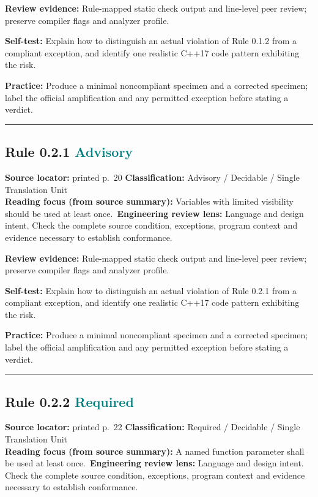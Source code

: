 \documentclass[10pt,letterpaper]{article}
\begin{document}
\textbf{Review evidence:} Rule-mapped static check output and line-level peer review; preserve compiler flags and analyzer profile.

\textbf{Self-test:} Explain how to distinguish an actual violation of Rule 0.1.2 from a compliant exception, and identify one realistic C++17 code pattern exhibiting the risk.\par
\textbf{Practice:} Produce a minimal noncompliant specimen and a corrected specimen; label the official amplification and any permitted exception before stating a verdict.
\smallskip\hrule\smallskip
\subsection*{Rule 0.2.1 \enspace \texorpdfstring{\small\textcolor{teal}{Advisory}}{Advisory}}
\noindent\textbf{Source locator:} printed p.~20 \quad\textbf{Classification:} Advisory / Decidable / Single Translation Unit\\
\textbf{Reading focus (from source summary):} Variables with limited visibility should be used at least once.\
\textbf{Engineering review lens:} Language and design intent. Check the complete source condition, exceptions, program context and evidence necessary to establish conformance.

\textbf{Review evidence:} Rule-mapped static check output and line-level peer review; preserve compiler flags and analyzer profile.

\textbf{Self-test:} Explain how to distinguish an actual violation of Rule 0.2.1 from a compliant exception, and identify one realistic C++17 code pattern exhibiting the risk.\par
\textbf{Practice:} Produce a minimal noncompliant specimen and a corrected specimen; label the official amplification and any permitted exception before stating a verdict.
\smallskip\hrule\smallskip
\subsection*{Rule 0.2.2 \enspace \texorpdfstring{\small\textcolor{teal}{Required}}{Required}}
\noindent\textbf{Source locator:} printed p.~22 \quad\textbf{Classification:} Required / Decidable / Single Translation Unit\\
\textbf{Reading focus (from source summary):} A named function parameter shall be used at least once.\
\textbf{Engineering review lens:} Language and design intent. Check the complete source condition, exceptions, program context and evidence necessary to establish conformance.
\end{document}
